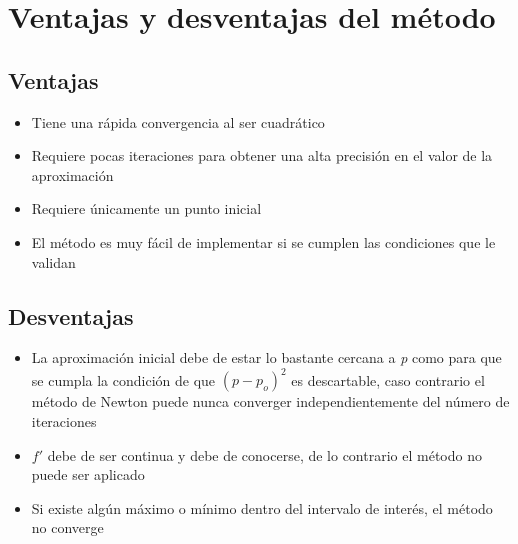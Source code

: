 \section{Ventajas y desventajas del método }

\subsection{Ventajas}

\begin{itemize}
    \item Tiene una rápida convergencia al ser cuadrático
    \item Requiere pocas iteraciones para obtener una alta precisión en el valor de la aproximación
    \item Requiere únicamente un punto inicial
    \item El método es muy fácil de implementar si se cumplen las condiciones que le validan
\end{itemize}

\subsection{Desventajas}

\begin{itemize}
    \item La aproximación inicial debe de estar lo bastante cercana a \textit{p} como para que se cumpla la  condición de que $( p - p_o )^2$ es descartable, caso contrario el método de Newton puede nunca converger independientemente del número de iteraciones \cite{burden}
    \item $f'$ debe de ser continua y debe de conocerse, de lo contrario el método no puede ser aplicado
    \item Si existe algún máximo o mínimo dentro del intervalo de interés, el método no converge
\end{itemize}